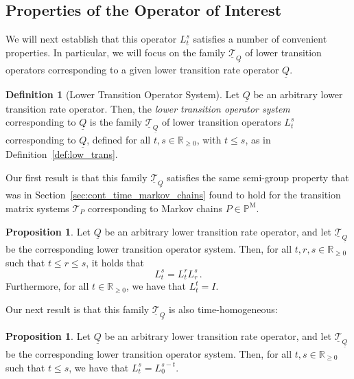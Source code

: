 \documentclass[10pt,a4paper]{paper}
\theoremstyle{definition}
\newtheorem{proposition}[theorem]{Proposition}
\newtheorem{definition}{Definition}
\newcommand{\reals}{\mathbb{R}}
\newcommand{\realsnonneg}{\reals_{\geq 0}}
\newcommand{\processes}{\mathbb{P}}
\newcommand{\mprocesses}{\processes^{\mathrm{M}}}
\newcommand{\lrate}{\underline{Q}}
\begin{document}
\subsection{Properties of the Operator of Interest}\label{sec:properties_lower_trans}

We will next establish that this operator $L_t^s$ satisfies a number of convenient properties. In particular, we will focus on the family $\underline{\mathcal{T}}_{\lrate}$ of lower transition operators corresponding to a given lower transition rate operator $\lrate$.

\begin{definition}[Lower Transition Operator System]
Let $\lrate$ be an arbitrary lower transition rate operator. Then, the \emph{lower transition operator system} corresponding to $\lrate$ is the family $\underline{\mathcal{T}}_{\lrate}$ of lower transition operators $L_t^s$ corresponding to $\lrate$, defined for all $t,s\in\realsnonneg$, with $t\leq s$, as in Definition~\ref{def:low_trans}.
\end{definition}

Our first result is that this family $\underline{\mathcal{T}}_{\lrate}$ satisfies the same semi-group property that was in Section~\ref{sec:cont_time_markov_chains} found to hold for the transition matrix systems $\mathcal{T}_P$ corresponding to Markov chains $P\in\mprocesses$.

\begin{proposition}\label{prop:lower_trans_system_is_system}
Let $\lrate$ be an arbitrary lower transition rate operator, and let $\underline{\mathcal{T}}_{\lrate}$ be the corresponding lower transition operator system. Then, for all $t,r,s\in\realsnonneg$ such that $t\leq r\leq s$, it holds that
\begin{equation*}
L_t^s = L_t^rL_r^s\,.
\end{equation*}
Furthermore, for all $t\in\realsnonneg$, we have that $L_t^t=I$.
\end{proposition}

Our next result is that this family $\underline{\mathcal{T}}_{\lrate}$ is also time-homogeneous:

\begin{proposition}\label{prop:lower_transition_is_homogeneous}
Let $\lrate$ be an arbitrary lower transition rate operator, and let $\underline{\mathcal{T}}_{\lrate}$ be the corresponding lower transition operator system. Then, for all $t,s\in\realsnonneg$ such that $t\leq s$, we have that $L_t^s=L_0^{s-t}$.
\end{proposition}
\end{document}
